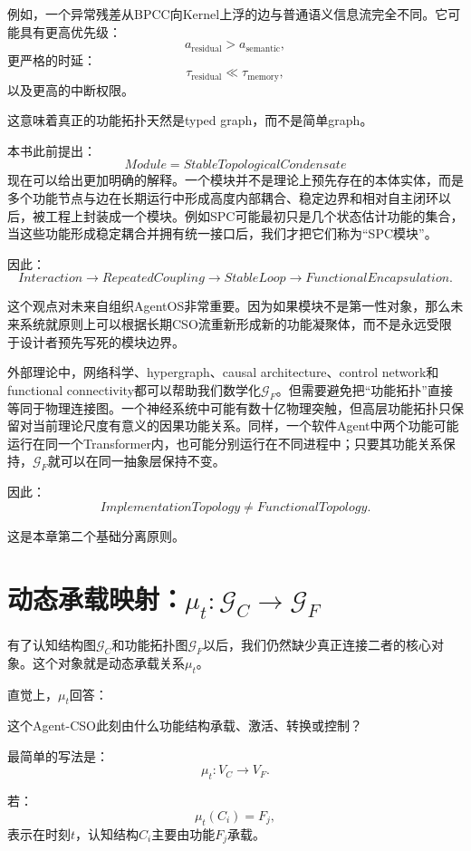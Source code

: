 例如，一个异常残差从BPCC向Kernel上浮的边与普通语义信息流完全不同。它可能具有更高优先级：
\[
a_{\text{residual}}>a_{\text{semantic}},
\]
更严格的时延：
\[
\tau_{\text{residual}}\ll\tau_{\text{memory}},
\]
以及更高的中断权限。

这意味着真正的功能拓扑天然是typed graph，而不是简单graph。

本书此前提出：
\[
\boxed{
Module
=
StableTopologicalCondensate
}
\]
现在可以给出更加明确的解释。一个模块并不是理论上预先存在的本体实体，而是多个功能节点与边在长期运行中形成高度内部耦合、稳定边界和相对自主闭环以后，被工程上封装成一个模块。例如SPC可能最初只是几个状态估计功能的集合，当这些功能形成稳定耦合并拥有统一接口后，我们才把它们称为“SPC模块”。

因此：
\[
Interaction
\rightarrow
RepeatedCoupling
\rightarrow
StableLoop
\rightarrow
FunctionalEncapsulation.
\]

这个观点对未来自组织AgentOS非常重要。因为如果模块不是第一性对象，那么未来系统就原则上可以根据长期CSO流重新形成新的功能凝聚体，而不是永远受限于设计者预先写死的模块边界。

外部理论中，网络科学、hypergraph、causal architecture、control network和functional connectivity都可以帮助我们数学化$\mathcal G_F$。但需要避免把“功能拓扑”直接等同于物理连接图。一个神经系统中可能有数十亿物理突触，但高层功能拓扑只保留对当前理论尺度有意义的因果功能关系。同样，一个软件Agent中两个功能可能运行在同一个Transformer内，也可能分别运行在不同进程中；只要其功能关系保持，$\mathcal G_F$就可以在同一抽象层保持不变。

因此：
\[
\boxed{
ImplementationTopology
\neq
FunctionalTopology.
}
\]

这是本章第二个基础分离原则。

\section{动态承载映射：$\mu_t:\mathcal G_C\rightarrow\mathcal G_F$}

有了认知结构图$\mathcal G_C$和功能拓扑图$\mathcal G_F$以后，我们仍然缺少真正连接二者的核心对象。这个对象就是动态承载关系$\mu_t$。

直觉上，$\mu_t$回答：
\begin{statementbox}
这个Agent-CSO此刻由什么功能结构承载、激活、转换或控制？
\end{statementbox}

最简单的写法是：
\[
\boxed{
\mu_t:
V_C
\rightarrow
V_F.
}
\]

若：
\[
\mu_t(C_i)=F_j,
\]
表示在时刻$t$，认知结构$C_i$主要由功能$F_j$承载。

